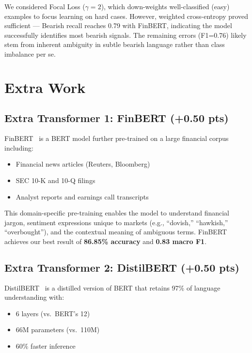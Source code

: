 \documentclass[11pt,a4paper]{article}
\begin{document}
We considered Focal Loss ($\gamma=2$), which down-weights well-classified (easy) examples to focus learning on hard cases. However, weighted cross-entropy proved sufficient — Bearish recall reaches 0.79 with FinBERT, indicating the model successfully identifies most bearish signals. The remaining errors (F1=0.76) likely stem from inherent ambiguity in subtle bearish language rather than class imbalance per se.

\section{Extra Work}

\subsection{Extra Transformer 1: FinBERT (+0.50 pts)}

FinBERT~\cite{araci2019finbert} is a BERT model further pre-trained on a large financial corpus including:
\begin{itemize}[noitemsep]
    \item Financial news articles (Reuters, Bloomberg)
    \item SEC 10-K and 10-Q filings
    \item Analyst reports and earnings call transcripts
\end{itemize}

This domain-specific pre-training enables the model to understand financial jargon, sentiment expressions unique to markets (e.g., ``dovish,'' ``hawkish,'' ``overbought''), and the contextual meaning of ambiguous terms. FinBERT achieves our best result of \textbf{86.85\% accuracy} and \textbf{0.83 macro F1}.

\subsection{Extra Transformer 2: DistilBERT (+0.50 pts)}

DistilBERT~\cite{sanh2019distilbert} is a distilled version of BERT that retains 97\% of language understanding with:
\begin{itemize}[noitemsep]
    \item 6 layers (vs.\ BERT's 12)
    \item 66M parameters (vs.\ 110M)
    \item 60\% faster inference
\end{itemize}
\end{document}
